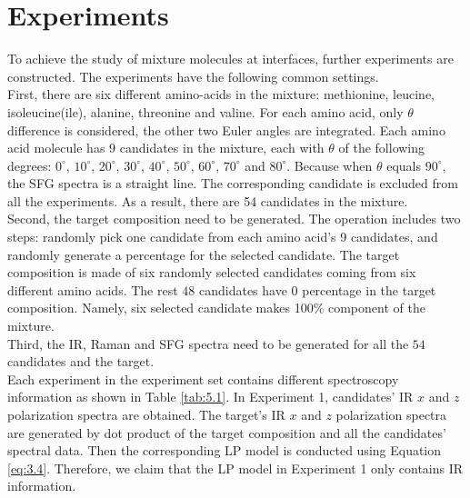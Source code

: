 \section{Experiments}
To achieve the study of mixture molecules at interfaces, further experiments are constructed. The experiments have the following common settings. \\

First, there are six different amino-acids in the mixture: methionine, leucine, isoleucine(ile), alanine, threonine and valine. For each amino acid, only $\theta$ difference is considered, the other two Euler angles are integrated. Each amino acid molecule has 9 candidates in the mixture, each with $\theta$ of the following degrees: $0^{\circ}$,  $10^{\circ}$, $20^{\circ}$, $30^{\circ}$, $40^{\circ}$, $50^{\circ}$, $60^{\circ}$, $70^{\circ}$ and $80^{\circ}$. Because when $\theta$ equals $90^{\circ}$, the SFG spectra is a straight line. The corresponding candidate is excluded from all the experiments. As a result, there are 54 candidates in the mixture. \\

Second, the target composition need to be generated. The operation includes two steps: randomly pick one candidate from each amino acid's 9 candidates, and randomly generate a percentage for the selected candidate. The target composition is made of six randomly selected candidates coming from six different amino acids. The rest $48$ candidates have $0$ percentage in the target composition. Namely, six selected candidate makes 100\% component of the mixture. \\

Third, the IR, Raman and SFG spectra need to be generated for all the $54$ candidates and the target. \\



Each experiment in the experiment set contains different spectroscopy information as shown in Table \ref{tab:5.1}. In Experiment 1, candidates' IR $x$ and $z$ polarization spectra are obtained. The target's IR $x$ and $z$ polarization spectra are generated by dot product of the target composition and all the candidates' spectral data. Then the corresponding LP model is conducted using Equation \ref{eq:3.4}. Therefore, we claim that the LP model in Experiment 1 only contains IR information.\\

